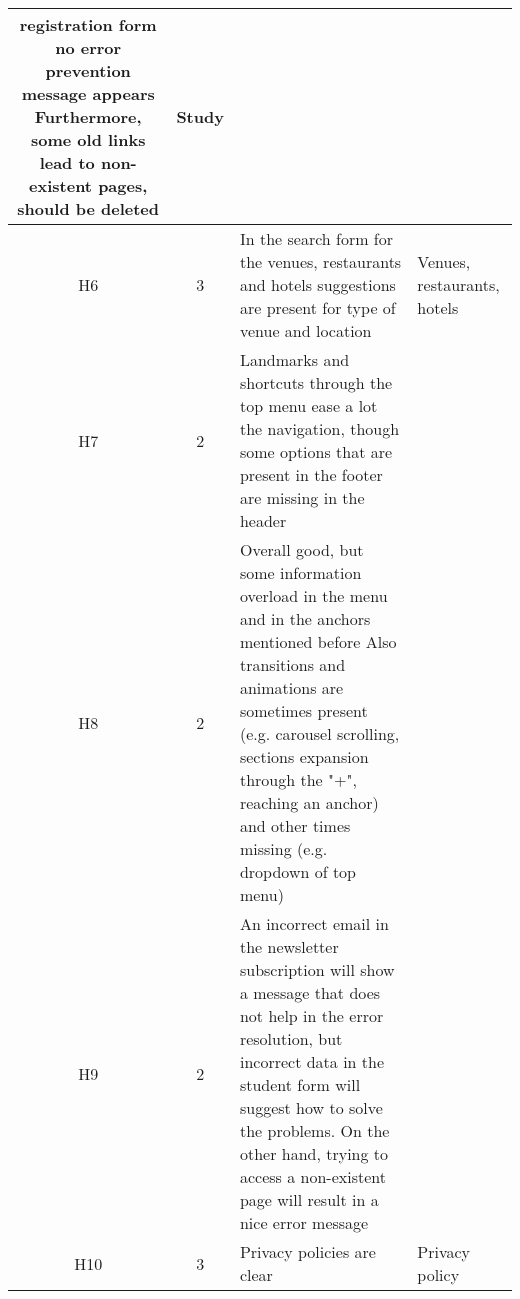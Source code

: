 \begin{tabularx}{\linewidth}{c c X p{3cm}}
    registration form no error prevention
    message appears
    Furthermore, some old links lead to
    non-existent pages, should be deleted & Study \\ \midrule
    H6 & 3 & In the search form for the venues,
    restaurants and hotels suggestions
    are present for type of venue
    and location & Venues, restaurants, hotels\\ \midrule
    H7 & 2 & Landmarks and shortcuts through the
    top menu ease a lot the navigation,
    though some options that are present
    in the footer are missing in the header & \\ \midrule
    H8 & 2 & Overall good, but some information
    overload in the menu and in the
    anchors mentioned before
    Also transitions and animations
    are sometimes present (e.g. carousel
    scrolling, sections expansion
    through the "+", reaching an anchor)
    and other times
    missing (e.g. dropdown of top menu) & \\ \midrule
    H9 & 2 & An incorrect email in the newsletter
    subscription will show a message
    that does not help in the
    error resolution,
    but incorrect data in the student
    form will suggest how to solve the
    problems.
    On the other hand, trying to access a
    non-existent page will result
    in a nice error message & \\ \midrule
    H10 & 3 & Privacy policies are clear & Privacy policy
\end{tabularx}
    
